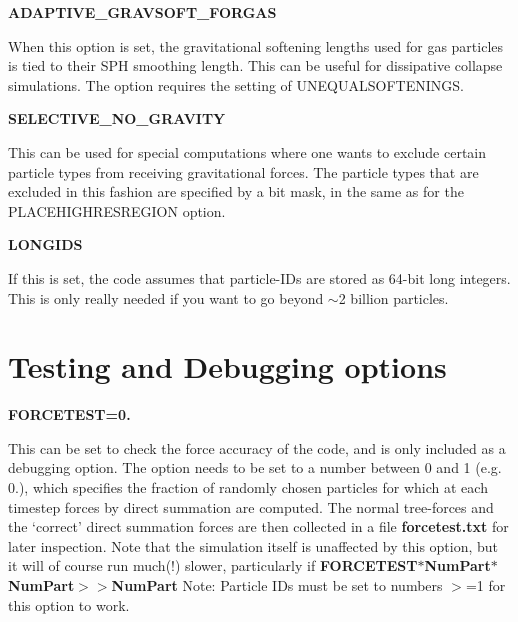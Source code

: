 \begin{DoxyItemize}
\item {\bfseries \-A\-D\-A\-P\-T\-I\-V\-E\-\_\-\-G\-R\-A\-V\-S\-O\-F\-T\-\_\-\-F\-O\-R\-G\-A\-S} \par
 \-When this option is set, the gravitational softening lengths used for gas particles is tied to their \-S\-P\-H smoothing length. \-This can be useful for dissipative collapse simulations. \-The option requires the setting of \-U\-N\-E\-Q\-U\-A\-L\-S\-O\-F\-T\-E\-N\-I\-N\-G\-S.
\end{DoxyItemize}


\begin{DoxyItemize}
\item {\bfseries \-S\-E\-L\-E\-C\-T\-I\-V\-E\-\_\-\-N\-O\-\_\-\-G\-R\-A\-V\-I\-T\-Y} \par
 \-This can be used for special computations where one wants to exclude certain particle types from receiving gravitational forces. \-The particle types that are excluded in this fashion are specified by a bit mask, in the same as for the \-P\-L\-A\-C\-E\-H\-I\-G\-H\-R\-E\-S\-R\-E\-G\-I\-O\-N option.
\end{DoxyItemize}


\begin{DoxyItemize}
\item {\bfseries \-L\-O\-N\-G\-I\-D\-S} \par
 \-If this is set, the code assumes that particle-\/\-I\-Ds are stored as 64-\/bit long integers. \-This is only really needed if you want to go beyond $\sim$2 billion particles.
\end{DoxyItemize}

\par
 \hypertarget{Gadget-Makefile_secmake8}{}\section{\-Testing and Debugging options}\label{Gadget-Makefile_secmake8}

\begin{DoxyItemize}
\item {\bfseries \-F\-O\-R\-C\-E\-T\-E\-S\-T=0.} \par
 \-This can be set to check the force accuracy of the code, and is only included as a debugging option. \-The option needs to be set to a number between 0 and 1 (e.\-g. 0.), which specifies the fraction of randomly chosen particles for which at each timestep forces by direct summation are computed. \-The normal tree-\/forces and the `correct' direct summation forces are then collected in a file {\bfseries forcetest.\-txt} for later inspection. \-Note that the simulation itself is unaffected by this option, but it will of course run much(!) slower, particularly if {\bfseries  \-F\-O\-R\-C\-E\-T\-E\-S\-T$\ast$\-Num\-Part$\ast$\-Num\-Part$>$$>$\-Num\-Part} \-Note\-: \-Particle \-I\-Ds must be set to numbers $>$=1 for this option to work.
\end{DoxyItemize}

